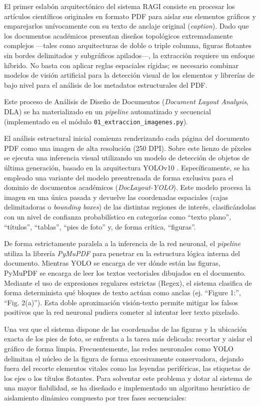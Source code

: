 \documentclass[a4paper]{report}
\begin{document}
El primer eslabón arquitectónico del sistema RAGI consiste en procesar los artículos científicos originales en formato PDF para aislar sus elementos gráficos y emparejarlos unívocamente con su texto de anclaje original (\textit{caption}). Dado que los documentos académicos presentan diseños topológicos extremadamente complejos —tales como arquitecturas de doble o triple columna, figuras flotantes sin bordes delimitados y subgráficos apilados—, la extracción requiere un enfoque híbrido. No basta con aplicar reglas espaciales rígidas; es necesario combinar modelos de visión artificial para la detección visual de los elementos y librerías de bajo nivel para el análisis de los metadatos estructurales del PDF.

Este proceso de Análisis de Diseño de Documentos (\textit{Document Layout Analysis}, DLA) se ha materializado en un \textit{pipeline} automatizado y secuencial (implementado en el módulo \texttt{01\_extraccion\_imagenes.py}). 

El análisis estructural inicial comienza renderizando cada página del documento PDF como una imagen de alta resolución (250 DPI). Sobre este lienzo de píxeles se ejecuta una inferencia visual utilizando un modelo de detección de objetos de última generación, basado en la arquitectura YOLOv10 \cite{wang2024yolov10}. Específicamente, se ha empleado una variante del modelo preentrenada de forma exclusiva para el dominio de documentos académicos (\textit{DocLayout-YOLO}). Este modelo procesa la imagen en una única pasada y devuelve las coordenadas espaciales (cajas delimitadoras o \textit{bounding boxes}) de las distintas regiones de interés, clasificándolas con un nivel de confianza probabilístico en categorías como ``texto plano'', ``títulos'', ``tablas'', ``pies de foto'' y, de forma crítica, ``figuras''.

De forma estrictamente paralela a la inferencia de la red neuronal, el \textit{pipeline} utiliza la librería \textit{PyMuPDF} para penetrar en la estructura lógica interna del documento. Mientras YOLO se encarga de ver dónde están las figuras, PyMuPDF se encarga de leer los textos vectoriales dibujados en el documento. Mediante el uso de expresiones regulares estrictas (Regex), el sistema clasifica de forma determinista qué bloques de texto actúan como anclas (ej. ``Figure 1:'', ``Fig. 2(a)''). Esta doble aproximación visión-texto permite mitigar los falsos positivos que la red neuronal pudiera cometer al intentar leer texto pixelado.

Una vez que el sistema dispone de las coordenadas de las figuras y la ubicación exacta de los pies de foto, se enfrenta a la tarea más delicada: recortar y aislar el gráfico de forma limpia. Frecuentemente, las redes neuronales como YOLO delimitan el núcleo de la figura de forma excesivamente conservadora, dejando fuera del recorte elementos vitales como las leyendas periféricas, las etiquetas de los ejes o los títulos flotantes. Para solventar este problema y dotar al sistema de una mayor fiabilidad, se ha diseñado e implementado un algoritmo heurístico de aislamiento dinámico compuesto por tres fases secuenciales:
\end{document}
